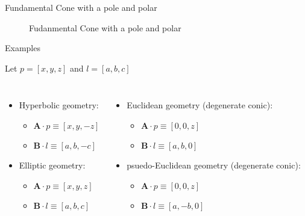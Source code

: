 \documentclass[10pt,ignorenonframetext,serif,onlymath]{beamer}
\providecommand{\tightlist}{%
  \setlength{\itemsep}{0pt}\setlength{\parskip}{0pt}}
\begin{document}
\begin{frame}{Fundamental Cone with a pole and polar}
\protect\hypertarget{sec:fundamental-cone-with-a-pole-and-polar}{}

\begin{figure}[hp]
\centering

\caption{Fudanmental Cone with a pole and polar}
\label{fig:F}
\end{figure}

\end{frame}

\begin{frame}{Examples}
\protect\hypertarget{sec:examples}{}

Let \(p = [x, y, z]\) and \(l = [a, b, c]\)

\begin{columns}

\begin{itemize}
\tightlist
\item
  Hyperbolic geometry:

  \begin{itemize}
  \tightlist
  \item
    \(\mathbf{A} \cdot p \equiv [x, y, -z]\)
  \item
    \(\mathbf{B} \cdot l \equiv [a, b, -c]\)
  \end{itemize}
\item
  Elliptic geometry:

  \begin{itemize}
  \tightlist
  \item
    \(\mathbf{A} \cdot p \equiv [x, y, z]\)
  \item
    \(\mathbf{B} \cdot l \equiv [a, b, c]\)
  \end{itemize}
\end{itemize}


\begin{itemize}
\tightlist
\item
  Euclidean geometry (degenerate conic):

  \begin{itemize}
  \tightlist
  \item
    \(\mathbf{A} \cdot p \equiv [0, 0, z]\)
  \item
    \(\mathbf{B} \cdot l \equiv [a, b, 0]\)
  \end{itemize}
\item
  psuedo-Euclidean geometry (degenerate conic):

  \begin{itemize}
  \tightlist
  \item
    \(\mathbf{A} \cdot p \equiv [0, 0, z]\)
  \item
    \(\mathbf{B} \cdot l \equiv [a, -b, 0]\)
  \end{itemize}
\end{itemize}

\end{columns}

\end{frame}
\end{document}
